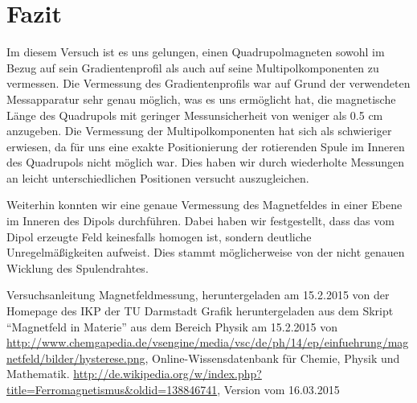 \documentclass[bigchapter,colorback,accentcolor=tud4b,linedtoc,11pt]{tudreport}
\begin{document}
\chapter{Fazit}
Im diesem Versuch ist es uns gelungen, einen Quadrupolmagneten sowohl im Bezug auf sein Gradientenprofil als auch auf seine Multipolkomponenten zu vermessen. Die Vermessung des Gradientenprofils war auf Grund der verwendeten Messapparatur sehr genau möglich, was es uns ermöglicht hat, die magnetische Länge des Quadrupols mit geringer Messunsicherheit von weniger als 0.5 cm anzugeben. Die Vermessung der Multipolkomponenten hat sich als schwieriger erwiesen, da für uns eine exakte Positionierung der rotierenden Spule im Inneren des Quadrupols nicht möglich war. Dies haben wir durch wiederholte Messungen an leicht unterschiedlichen Positionen versucht auszugleichen.

Weiterhin konnten wir eine genaue Vermessung des Magnetfeldes in einer Ebene im Inneren des Dipols durchführen. Dabei haben wir festgestellt, dass das vom Dipol erzeugte Feld keinesfalls homogen ist, sondern deutliche Unregelmäßigkeiten aufweist. Dies stammt möglicherweise von der nicht genauen Wicklung des Spulendrahtes.

\cleardoublepage{}
\newpage
\begin{thebibliography}{100}
   Versuchsanleitung Magnetfeldmessung, heruntergeladen am 15.2.2015 von der Homepage des IKP der TU Darmstadt
   Grafik heruntergeladen aus dem Skript "`Magnetfeld in Materie"' aus dem Bereich Physik am 15.2.2015 von \url{http://www.chemgapedia.de/vsengine/media/vsc/de/ph/14/ep/einfuehrung/magnetfeld/bilder/hysterese.png}, Online-Wissensdatenbank für Chemie, Physik und Mathematik.
   \url{http://de.wikipedia.org/w/index.php?title=Ferromagnetismus&oldid=138846741}, Version vom 16.03.2015
\end{thebibliography}
\end{document}

